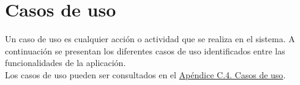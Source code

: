 \section{Casos de uso}

Un caso de uso \cite{casodeuso} es cualquier acción o actividad que se realiza en el sistema. A continuación se presentan los diferentes casos de uso identificados entre las funcionalidades de la aplicación.
\\

Los casos de uso pueden ser consultados en el \hyperref[APCasosUso]{Apéndice C.4. Casos de uso}.